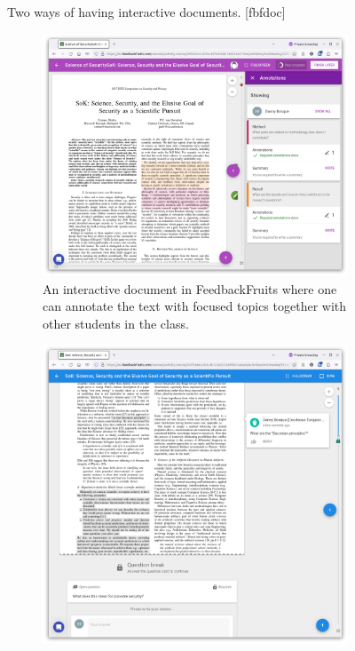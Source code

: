 \begin{figure}[t]
  \begin{sidecaption}
    {Two ways of having interactive documents.}
    [fbfdoc]
    \begin{subfigure}[b]{0.49\columnwidth}
      \centering
      \includegraphics[width=\columnwidth]{figs/fbf-doc-annotations.png}
      \caption{%
        An interactive document in FeedbackFruits where one can annotate the 
        text with focused topics together with other students in the class.%
        \label{fbfdocannotation}%
      }
    \end{subfigure}
    \hfill
    \begin{subfigure}[b]{0.49\columnwidth}
      \centering
      \includegraphics[width=\columnwidth]{figs/fbf-doc-quiz-question.png}

\end{subfigure}
\end{sidecaption}
\end{figure}
